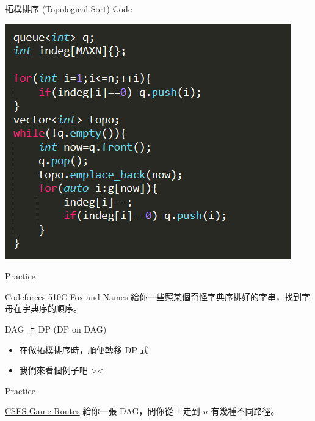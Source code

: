 \documentclass[aspectratio=169]{beamer}
\begin{document}
    \begin{frame}{拓樸排序 (Topological Sort) Code}
        \begin{center}
            \includegraphics[scale=0.7]{code/topo_code.png}
        \end{center}
    \end{frame}
    
    \begin{frame}{Practice}
        \begin{block}{\href{https://codeforces.com/problemset/problem/510/C}{Codeforces 510C Fox and Names}}
        給你一些照某個奇怪字典序排好的字串，找到字母在字典序的順序。
        \end{block}
    \end{frame}
    
    \begin{frame}{DAG 上 DP (DP on DAG)}
        \begin{itemize}
            \item 在做拓樸排序時，順便轉移 DP 式
            \item 我們來看個例子吧 ><
        \end{itemize}
    \end{frame}
    
    \begin{frame}{Practice}
        \begin{block}{\href{https://cses.fi/problemset/task/1681/}{CSES Game Routes}}
        給你一張 DAG，問你從 $1$ 走到 $n$ 有幾種不同路徑。
        \end{block}
    \end{frame}
    
\end{document}
